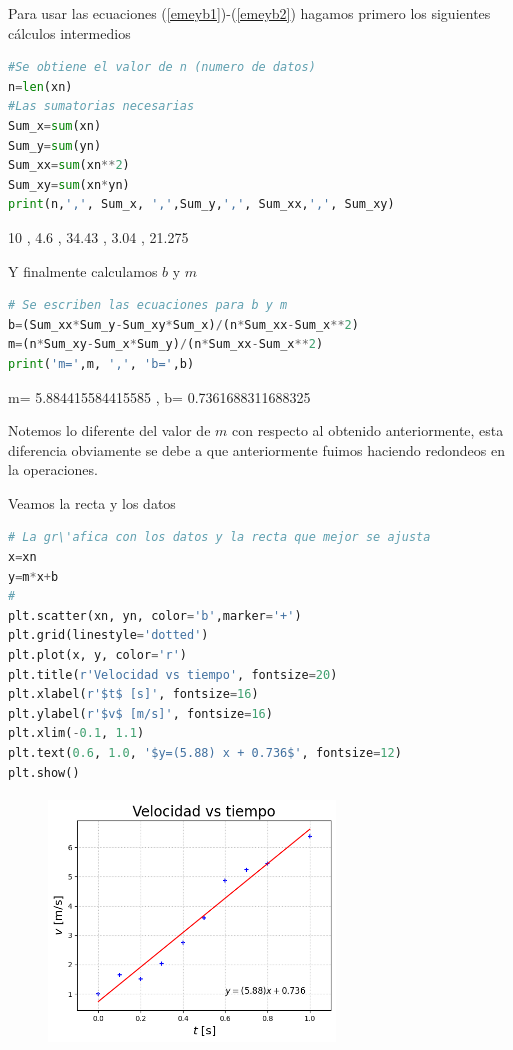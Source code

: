 Para usar las ecuaciones (\ref{emeyb1})-(\ref{emeyb2}) hagamos primero los siguientes c\'alculos intermedios
\begin{lstlisting}[language=Python] 
#Se obtiene el valor de n (numero de datos)
n=len(xn)
#Las sumatorias necesarias 
Sum_x=sum(xn)
Sum_y=sum(yn)
Sum_xx=sum(xn**2)
Sum_xy=sum(xn*yn)
print(n,',', Sum_x, ',',Sum_y,',', Sum_xx,',', Sum_xy)
\end{lstlisting}
\begin{tcolorbox}[width=\textwidth,colback={ghostwhite}]   
{\small 
10 , 4.6 , 34.43 , 3.04 , 21.275
}
\end{tcolorbox} 

Y finalmente calculamos $b$ y $m$
\begin{lstlisting}[language=Python] 
# Se escriben las ecuaciones para b y m 
b=(Sum_xx*Sum_y-Sum_xy*Sum_x)/(n*Sum_xx-Sum_x**2)
m=(n*Sum_xy-Sum_x*Sum_y)/(n*Sum_xx-Sum_x**2)
print('m=',m, ',', 'b=',b)
\end{lstlisting}
\begin{tcolorbox}[width=\textwidth,colback={ghostwhite}]   
{\small 
m= 5.884415584415585 , b= 0.7361688311688325
}
\end{tcolorbox} 

Notemos lo diferente del valor de $m$ con respecto al obtenido anteriormente, esta diferencia obviamente se debe a que anteriormente fuimos haciendo redondeos en la operaciones. 

Veamos la recta y los datos
\begin{lstlisting}[language=Python] 
# La gr\'afica con los datos y la recta que mejor se ajusta 
x=xn
y=m*x+b
#
plt.scatter(xn, yn, color='b',marker='+')
plt.grid(linestyle='dotted')
plt.plot(x, y, color='r')
plt.title(r'Velocidad vs tiempo', fontsize=20)
plt.xlabel(r'$t$ [s]', fontsize=16)
plt.ylabel(r'$v$ [m/s]', fontsize=16)
plt.xlim(-0.1, 1.1)
plt.text(0.6, 1.0, '$y=(5.88) x + 0.736$', fontsize=12)
plt.show()
\end{lstlisting}
\begin{figure}[h]
\begin{center}
\includegraphics[height=2.6in,width=3.0in]{figuras/fig13}  
\label{figdatos2}
\end{center}
\end{figure}

